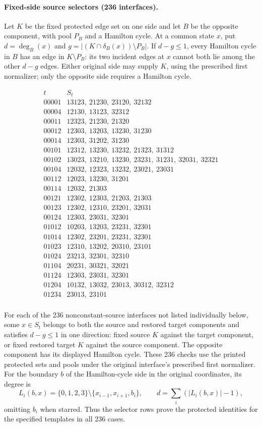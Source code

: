 \paragraph{Fixed-side source selectors (236 interfaces).}
Let $K$ be the fixed protected edge set on one side and let $B$ be the
opposite component, with pool $P_B$ and a Hamilton cycle. At a common
state $x$, put $d=\deg_B(x)$ and
$g=|(K\cap\delta_B(x))\setminus P_B|$.
If $d-g\le1$, every Hamilton cycle in $B$ has an edge in $K\setminus P_B$:
its two incident edges at $x$ cannot both lie among the other $d-g$ edges.
Either original side may supply $K$, using the prescribed first normalizer;
only the opposite side requires a Hamilton cycle.

\[\begin{array}{c|l}t&S_t\\\hline
00001&13123,\ 21230,\ 23120,\ 32132\\
00004&12130,\ 13123,\ 32312\\
00011&12323,\ 21230,\ 21320\\
00012&12303,\ 13203,\ 13230,\ 31230\\
00014&12303,\ 31202,\ 31230\\
00101&12312,\ 13230,\ 13232,\ 21323,\ 31312\\
00102&13023,\ 13210,\ 13230,\ 23231,\ 31231,\ 32031,\ 32321\\
00104&12032,\ 12323,\ 13232,\ 23021,\ 23031\\
00112&12023,\ 13230,\ 31201\\
00114&12032,\ 21303\\
00121&12302,\ 12303,\ 21203,\ 21303\\
00123&12302,\ 12310,\ 23201,\ 32031\\
00124&12303,\ 23031,\ 32301\\
01012&10203,\ 13203,\ 23231,\ 32301\\
01014&12302,\ 23201,\ 23231,\ 32301\\
01023&12310,\ 13202,\ 20310,\ 23101\\
01024&23213,\ 32301,\ 32310\\
01104&20231,\ 30321,\ 32021\\
01124&12303,\ 23031,\ 32301\\
01204&10132,\ 13032,\ 23013,\ 30312,\ 32312\\
01234&23013,\ 23101\\
\end{array}\]


For each of the 236 nonconstant-source interfaces not listed individually
below, some $x\in S_t$ belongs to both the source and restored target
components and satisfies $d-g\le1$ in one direction: fixed source $K$
against the target component, or fixed restored target $K$ against the
source component. The opposite component has its displayed Hamilton cycle.
These 236 checks use the printed protected sets and pools under the
original interface's prescribed first normalizer. For the boundary $b$
of the Hamilton-cycle side in the original coordinates, its degree is
\[
L_i(b,x)=\{0,1,2,3\}\setminus\{x_{i-1},x_{i+1},b_i\},\qquad
d=\sum_i(|L_i(b,x)|-1),
\]
omitting $b_i$ when starred. Thus the selector rows prove the protected
identities for the specified templates in all 236 cases.

